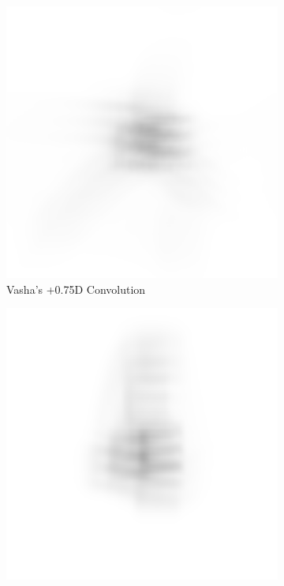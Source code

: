 \documentclass{article}
\begin{document}
\begin{figure}[H]
\begin{subfigure}{.3\textwidth}
  \centering
  \includegraphics[width=1\linewidth]{Vasha_R_G_0530_2_500_zer_05_5_PSF_convE.png}
  \caption{Vasha's +0.75D Convolution}
  \label{fig:vasha05d}
\end{subfigure}
\begin{subfigure}{.3\textwidth}
  \centering
  \includegraphics[width=1\linewidth]{Liz_R_G_0523_2_500_zer_05_5_PSF_convE.png}

\end{subfigure}
\end{figure}
\end{document}
